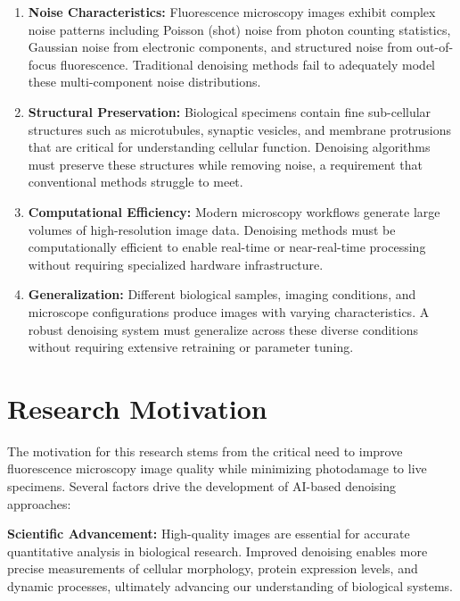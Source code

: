 \documentclass[12pt,a4paper]{report}
\begin{document}
\begin{enumerate}
    \item \textbf{Noise Characteristics:} Fluorescence microscopy images exhibit complex noise patterns including Poisson (shot) noise from photon counting statistics, Gaussian noise from electronic components, and structured noise from out-of-focus fluorescence. Traditional denoising methods fail to adequately model these multi-component noise distributions.

    \item \textbf{Structural Preservation:} Biological specimens contain fine sub-cellular structures such as microtubules, synaptic vesicles, and membrane protrusions that are critical for understanding cellular function. Denoising algorithms must preserve these structures while removing noise, a requirement that conventional methods struggle to meet.

    \item \textbf{Computational Efficiency:} Modern microscopy workflows generate large volumes of high-resolution image data. Denoising methods must be computationally efficient to enable real-time or near-real-time processing without requiring specialized hardware infrastructure.

    \item \textbf{Generalization:} Different biological samples, imaging conditions, and microscope configurations produce images with varying characteristics. A robust denoising system must generalize across these diverse conditions without requiring extensive retraining or parameter tuning.
\end{enumerate}

\section{Research Motivation}

The motivation for this research stems from the critical need to improve fluorescence microscopy image quality while minimizing photodamage to live specimens. Several factors drive the development of AI-based denoising approaches:

\vspace{0.5cm}

\textbf{Scientific Advancement:} High-quality images are essential for accurate quantitative analysis in biological research. Improved denoising enables more precise measurements of cellular morphology, protein expression levels, and dynamic processes, ultimately advancing our understanding of biological systems.
\end{document}
